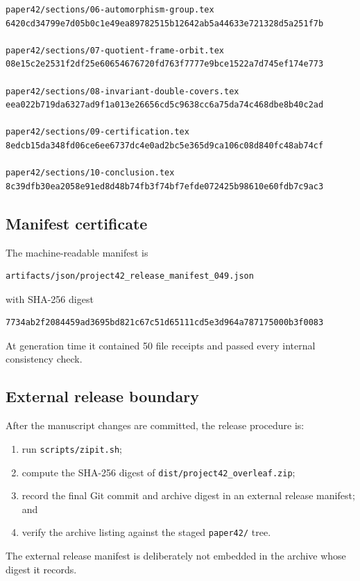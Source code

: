 \begin{verbatim}
paper42/sections/06-automorphism-group.tex
6420cd34799e7d05b0c1e49ea89782515b12642ab5a44633e721328d5a251f7b

paper42/sections/07-quotient-frame-orbit.tex
08e15c2e2531f2df25e60654676720fd763f7777e9bce1522a7d745ef174e773

paper42/sections/08-invariant-double-covers.tex
eea022b719da6327ad9f1a013e26656cd5c9638cc6a75da74c468dbe8b40c2ad

paper42/sections/09-certification.tex
8edcb15da348fd06ce6ee6737dc4e0ad2bc5e365d9ca106c08d840fc48ab74cf

paper42/sections/10-conclusion.tex
8c39dfb30ea2058e91ed8d48b74fb3f74bf7efde072425b98610e60fdb7c9ac3
\end{verbatim}

\subsection{Manifest certificate}

The machine-readable manifest is

\begin{verbatim}
artifacts/json/project42_release_manifest_049.json
\end{verbatim}

with SHA-256 digest

\begin{verbatim}
7734ab2f2084459ad3695bd821c67c51d65111cd5e3d964a787175000b3f0083
\end{verbatim}

At generation time it contained
50
file receipts and passed every internal consistency check.

\subsection{External release boundary}

After the manuscript changes are committed, the release procedure is:

\begin{enumerate}

\item run \texttt{scripts/zipit.sh};

\item compute the SHA-256 digest of
\texttt{dist/project42\_overleaf.zip};

\item record the final Git commit and archive digest in an external
release manifest; and

\item verify the archive listing against the staged
\texttt{paper42/} tree.

\end{enumerate}

The external release manifest is deliberately not embedded in the archive
whose digest it records.
